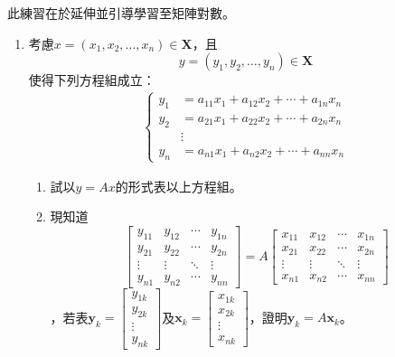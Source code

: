 \documentclass[12pt]{article}
\begin{document}
    此練習在於延伸並引導學習至矩陣對數。
    \begin{enumerate}
        \item 考慮$x=(x_1,x_2,\dots,x_n)\in \mathbf{X}$，且$$y=(y_1,y_2,\dots,y_n)\in \mathbf{X}$$使得下列方程組成立：\begin{align*}
            \begin{cases}
                y_1&=a_{11}x_1+a_{12}x_2+\cdots+a_{1n}x_n\\
                y_2&=a_{21}x_1+a_{22}x_2+\cdots+a_{2n}x_n\\
                &\vdots\\
                y_n&=a_{n1}x_1+a_{n2}x_2+\cdots+a_{nn}x_n
            \end{cases}
        \end{align*}
        \begin{enumerate}
            \item 試以$y=Ax$的形式表以上方程組。
            \item 現知道$$\begin{bmatrix}
                y_{11}&y_{12}&\cdots&y_{1n}\\
                y_{21}&y_{22}&\cdots&y_{2n}\\
                \vdots&\vdots&\ddots&\vdots\\
                y_{n1}&y_{n2}&\cdots&y_{nn}
            \end{bmatrix}=A\begin{bmatrix}
                x_{11}&x_{12}&\cdots&x_{1n}\\
                x_{21}&x_{22}&\cdots&x_{2n}\\
                \vdots&\vdots&\ddots&\vdots\\
                x_{n1}&x_{n2}&\cdots&x_{nn}
            \end{bmatrix}$$，若表$\mathbf{y}_k=\begin{bmatrix}
                y_{1k}\\
                y_{2k}\\
                \vdots\\
                y_{nk}
            \end{bmatrix}$及$\mathbf{x}_k=\begin{bmatrix}
                x_{1k}\\
                x_{2k}\\
                \vdots\\
                x_{nk}
            \end{bmatrix}$，證明$\mathbf{y}_k=A\mathbf{x}_k$。

\end{enumerate}
\end{enumerate}
\end{document}
